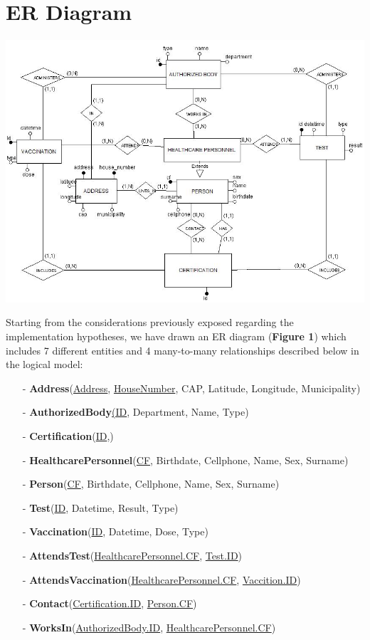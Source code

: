 \documentclass[a4paper,12pt]{article}
\begin{document}
\section{ER Diagram}
\paragraph{}
	\begin{center}
 		\includegraphics[width = 15 cm]{ER_diagram.png}
	\end{center}
\par Starting from the considerations previously exposed regarding the implementation hypotheses, we have drawn an ER diagram (\textbf{Figure 1}) which includes 7 different entities and 4 many-to-many relationships described below in the logical model: \par
  \begin{itemize}[noitemsep]
   	\item[-]	\textbf{Address}(\underline{Address}, \underline{HouseNumber}, CAP, Latitude, Longitude, Municipality)
	\item[-]	\textbf{AuthorizedBody}\underline{(ID}, Department, Name, Type)
	\item[-]	\textbf{Certification}(\underline{ID},)
	\item[-]	\textbf{HealthcarePersonnel}(\underline{CF}, Birthdate, Cellphone, Name, Sex, Surname)
	\item[-]	\textbf{Person}(\underline{CF}, Birthdate, Cellphone, Name, Sex, Surname)
	\item[-]	\textbf{Test}(\underline{ID}, Datetime, Result, Type)
	\item[-]	\textbf{Vaccination}(\underline{ID}, Datetime, Dose, Type)
\item[-]	\textbf{AttendsTest}(\underline{HealthcarePersonnel.CF}, \underline{Test.ID})	
	\item[-]	\textbf{AttendsVaccination}(\underline{HealthcarePersonnel.CF}, \underline{Vaccition.ID})
	\item[-]	\textbf{Contact}(\underline{Certification.ID}, \underline{Person.CF})
	\item[-]	\textbf{WorksIn}(\underline{AuthorizedBody.ID}, \underline{HealthcarePersonnel.CF})
  \end{itemize} \par
\end{document}
